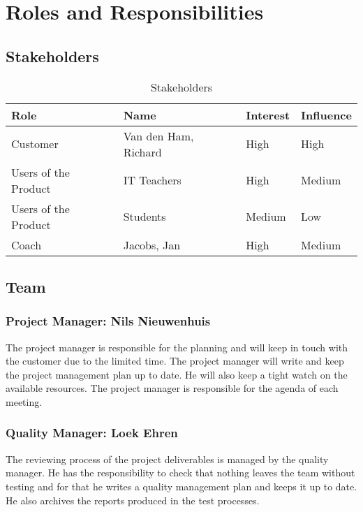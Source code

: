 \section{Roles and Responsibilities}

\subsection{Stakeholders}
\begin{table}[h]
    \centering
    \begin{tabular}{l|l|l|l}
        \textbf{Role}               &   \textbf{Name}           &   \textbf{Interest}     &     \textbf{Influence}  \\ \hline \hline
        Customer                    &   Van den Ham, Richard    &   High                  &     High                \\ \hline
        Users of the Product        &   IT Teachers             &   High                  &     Medium              \\ \hline
        Users of the Product        &   Students                &   Medium                &     Low                 \\ \hline
        Coach                       &   Jacobs, Jan             &   High                  &     Medium              \\ \hline        
    \end{tabular}
    \caption{Stakeholders}
\end{table}

\subsection{Team}
    \subsubsection{Project Manager: Nils Nieuwenhuis}
    The project manager is responsible for the planning
    and will keep in touch with the customer due to the limited time. The project manager will write and
    keep the project management plan up to date. He will also keep a tight watch on the available
    resources. The project manager is responsible for the agenda of each meeting.

    \subsubsection{Quality Manager: Loek Ehren}
    The reviewing process of the project deliverables is managed by the quality manager. He has the responsibility to check that nothing leaves
    the team without testing and for that he writes a quality management plan and keeps it up to date. He also archives the reports produced
    in the test processes. 

